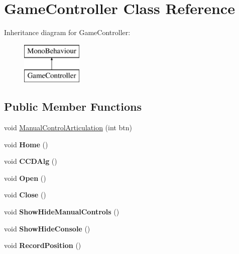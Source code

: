 \hypertarget{class_game_controller}{}\section{Game\+Controller Class Reference}
\label{class_game_controller}
Inheritance diagram for Game\+Controller\+:\begin{figure}[H]
\begin{center}
\leavevmode
\includegraphics[height=2.000000cm]{class_game_controller}
\end{center}
\end{figure}
\subsection*{Public Member Functions}
\begin{DoxyCompactItemize}
\item 
void \mbox{\hyperlink{class_game_controller_af2f693d76f1b9bf4ff0403802ad44cae}{Manual\+Control\+Articulation}} (int btn)
\item 
\mbox{\label{class_game_controller_a92a798e28f38aa15306e58dbdef1099a}} 
void {\bfseries Home} ()
\item 
\mbox{\label{class_game_controller_a26dc6be23c4ac6582898e30d17059c95}} 
void {\bfseries C\+C\+D\+Alg} ()
\item 
\mbox{\label{class_game_controller_ab69f0ec04df1e4d52b182d1dddd0606c}} 
void {\bfseries Open} ()
\item 
\mbox{\label{class_game_controller_a232d433ba9f07944bcc274841bf8cc7c}} 
void {\bfseries Close} ()
\item 
\mbox{\label{class_game_controller_ab55a4d6d21f7e08aac2e27ad92033d56}} 
void {\bfseries Show\+Hide\+Manual\+Controls} ()
\item 
\mbox{\label{class_game_controller_ad037a03af50093f97a244acb6ee7cfb5}} 
void {\bfseries Show\+Hide\+Console} ()
\item 
\mbox{\label{class_game_controller_a22485211ee6a27979be2b168315bfa90}} 
void {\bfseries Record\+Position} ()
\end{DoxyCompactItemize}
